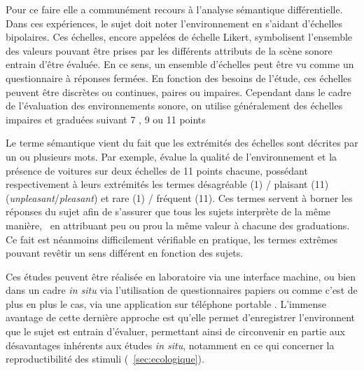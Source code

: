Pour ce faire elle a communément recours à l'analyse sémantique différentielle. Dans ces expériences, le sujet doit noter l'environnement en s'aidant d'échelles bipolaires. Ces échelles, encore appelées de échelle Likert, symbolisent l'ensemble des valeurs pouvant être prises par les différents attributs de la scène sonore entrain d'être évaluée. En ce sens, un ensemble d'échelles peut être vu comme un questionnaire à réponses fermées. En fonction des besoins de l'étude, ces échelles peuvent être discrètes ou continues, paires ou impaires. Cependant dans le cadre de l'évaluation des environnements sonore, on utilise généralement des échelles impaires et graduées suivant 7 \citep{raimbault2006qualitative}, 9 \citep{hall2013exploratory} ou 11 points \citep{ricciardi2015sound}

Le terme sémantique vient du fait que les extrémités des échelles sont décrites par un ou plusieurs mots. Par exemple, \citep{ricciardi2015sound} évalue la qualité de l'environnement et la présence de voitures sur deux échelles de 11 points chacune, possédant respectivement à leurs extrémités les termes désagréable (1) / plaisant (11) (\emph{unpleasant}/\emph{pleasant}) et rare (1) / fréquent (11). Ces termes servent à borner les réponses du sujet afin de s'assurer que tous les sujets interprète de la même manière, \ie~en attribuant  peu ou prou la même valeur à chacune des graduations. Ce fait est néanmoins difficilement vérifiable en pratique, les termes extrêmes pouvant revêtir un sens différent en fonction des sujets.

Ces études peuvent être réalisée en laboratoire via une interface machine, ou bien dans un cadre \emph{in situ} via l'utilisation de questionnaires papiers \citep{jeon2013soundwalk,torija2013application} ou comme c'est de plus en plus le cas, via une application sur téléphone portable \citep{kardous2014evaluation,ricciardi2015sound}. L'immense avantage de cette dernière approche est qu'elle permet d'enregistrer l'environnent que le sujet est entrain d'évaluer, permettant ainsi de circonvenir en partie aux désavantages inhérents aux études \emph{in situ}, notamment en ce qui concerner la reproductibilité des stimuli (\Cf~\ref{sec:ecologique}).

